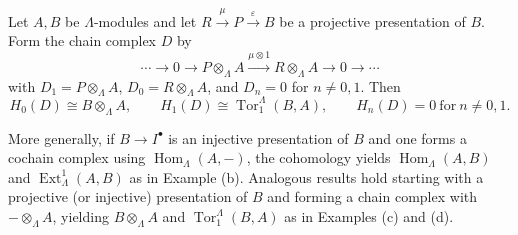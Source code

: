 Let $A, B$ be $\Lambda$-modules and let $R \xrightarrow{\mu} P \xrightarrow{\varepsilon} B$ be a projective presentation of $B$. Form the chain complex $D$ by
$$
\cdots \longrightarrow 0 \longrightarrow P \otimes_\Lambda A \xrightarrow{\mu \otimes 1} R \otimes_\Lambda A \longrightarrow 0 \longrightarrow \cdots
$$
with $D_1 = P \otimes_\Lambda A$, $D_0 = R \otimes_\Lambda A$, and $D_n = 0$ for $n \neq 0, 1$. Then
$$
H_0(D) \cong B \otimes_\Lambda A, \qquad
H_1(D) \cong \operatorname{Tor}_1^\Lambda(B, A), \qquad
H_n(D) = 0 \ \text{for}\ n \neq 0, 1.
$$

More generally, if $B \to I^\bullet$ is an injective presentation of $B$ and one forms a cochain complex using $\operatorname{Hom}_\Lambda(A, -)$, the cohomology yields $\operatorname{Hom}_\Lambda(A, B)$ and $\operatorname{Ext}_\Lambda^1(A, B)$ as in Example (b). Analogous results hold starting with a projective (or injective) presentation of $B$ and forming a chain complex with $-\otimes_\Lambda A$, yielding $B \otimes_\Lambda A$ and $\operatorname{Tor}_1^\Lambda(B, A)$ as in Examples (c) and (d).
